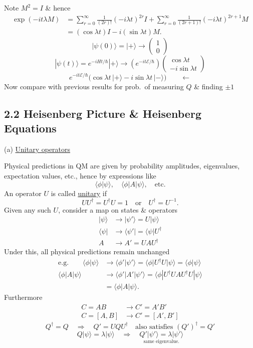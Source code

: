 \documentclass[11pt,a4paper]{article}
\begin{document}
Note $M^2=I$ \& hence
\begin{align*}
    \exp(-it\lambda M)
    &=\sum_{r=0}^{\infty}\frac{1}{(2r)!}(-i\lambda t)^{2r}I
      +\sum_{r=0}^{\infty}\frac{1}{(2r+1)!}(-i\lambda t)^{2r+1}M\\
    &=(\cos\lambda t)I-i(\sin\lambda t)M.
\end{align*}
\[
    |\psi(0)\rangle=|+\rangle\to\begin{pmatrix}1\\0\end{pmatrix}
\]
\[
    |\psi(t)\rangle=e^{-iHt/\hbar}|+\rangle
    \to\left(e^{-it\mathcal{E}/\hbar}\right)
    \begin{pmatrix}\cos\lambda t\\-i\sin\lambda t\end{pmatrix}
\]
\[
    e^{-it\mathcal{E}/\hbar}
    \bigl(\cos\lambda t\,|+\rangle-i\sin\lambda t\,|-\rangle\bigr)
    \qquad\longleftarrow
\]
Now compare with previous results for prob.\ of measuring $Q$ \& finding $\pm1$

\subsection*{2.2 Heisenberg Picture \& Heisenberg Equations}

\noindent
(a) \underline{Unitary operators}

Physical predictions in QM are given by probability amplitudes,
eigenvalues, expectation values, etc., hence by expressions like
\[
    \langle\phi|\psi\rangle,\quad\langle\phi|A|\psi\rangle,\quad\text{etc.}
\]
An operator $U$ is called \underline{unitary} if
\[
    UU^\dagger=U^\dagger U=1\quad\text{or}\quad U^\dagger=U^{-1}.
\]
Given any such $U$, consider a map on states \& operators
\[
    \begin{aligned}
        |\psi\rangle&\longrightarrow |\psi'\rangle=U|\psi\rangle\\
        \langle\psi|&\longrightarrow\langle\psi'|=\langle\psi|U^\dagger\\
        A&\longrightarrow A'=UAU^\dagger
    \end{aligned}
\]
Under this, all physical predictions remain unchanged
\begin{align*}
    \text{e.g.}\qquad
    \langle\phi|\psi\rangle&\to\langle\phi'|\psi'\rangle
    =\langle\phi|U^\dagger U|\psi\rangle=\langle\phi|\psi\rangle\\
    \langle\phi|A|\psi\rangle&\to\langle\phi'|A'|\psi'\rangle
    =\langle\phi|U^\dagger UAU^\dagger U|\psi\rangle\\
    &=\langle\phi|A|\psi\rangle.
\end{align*}
Furthermore
\[
    \begin{aligned}
        C=AB&\longrightarrow C'=A'B'\\
        C=[A,B]&\longrightarrow C'=[A',B']
    \end{aligned}
\]
\[
    Q^\dagger=Q\quad\Rightarrow\quad Q'=UQU^\dagger
    \quad\text{also satisfies }(Q')^\dagger=Q'
\]
\[
    Q|\psi\rangle=\lambda|\psi\rangle
    \quad\Rightarrow\quad
    \underset{\text{same eigenvalue.}}{Q'|\psi'\rangle=\lambda|\psi'\rangle}
\]
\end{document}
